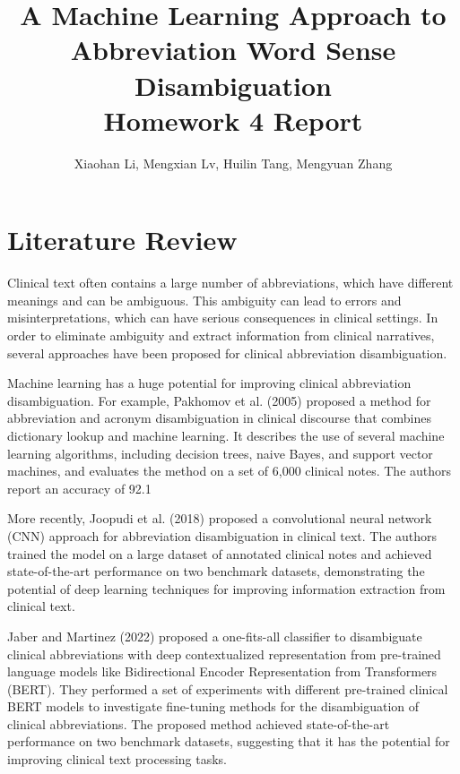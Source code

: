 \documentclass{article}
\author{Xiaohan Li, Mengxian Lv, Huilin Tang, Mengyuan Zhang}
\title{\huge{A Machine Learning Approach to Abbreviation Word Sense Disambiguation}\\
\LARGE{Homework 4 Report}}
\begin{document}
    \begin{titlepage}
        \maketitle    
    \end{titlepage}
    \tableofcontents
    \section{Literature Review}
    Clinical text often contains a large number of abbreviations, which have different meanings and can be ambiguous. This ambiguity can lead to errors and misinterpretations, which can have serious consequences in clinical settings. In order to eliminate ambiguity and extract information from clinical narratives, several approaches have been proposed for clinical abbreviation disambiguation.

    Machine learning has a huge potential for improving clinical abbreviation disambiguation. For example, Pakhomov et al. (2005) proposed a method for abbreviation and acronym disambiguation in clinical discourse that combines dictionary lookup and machine learning.\cite{pakhomov2005abbreviation} It describes the use of several machine learning algorithms, including decision trees, naive Bayes, and support vector machines, and evaluates the method on a set of 6,000 clinical notes. The authors report an accuracy of 92.1%

    More recently, Joopudi et al. (2018) proposed a convolutional neural network (CNN) approach for abbreviation disambiguation in clinical text.\cite{joopudi2018convolutional} The authors trained the model on a large dataset of annotated clinical notes and achieved state-of-the-art performance on two benchmark datasets, demonstrating the potential of deep learning techniques for improving information extraction from clinical text.

    Jaber and Martinez (2022) proposed a one-fits-all classifier to disambiguate clinical abbreviations with deep contextualized representation from pre-trained language models like Bidirectional Encoder Representation from Transformers (BERT).\cite{jaber2022disambiguating} They performed a set of experiments with different pre-trained clinical BERT models to investigate fine-tuning methods for the disambiguation of clinical abbreviations. The proposed method achieved state-of-the-art performance on two benchmark datasets, suggesting that it has the potential for improving clinical text processing tasks.
\end{document}
